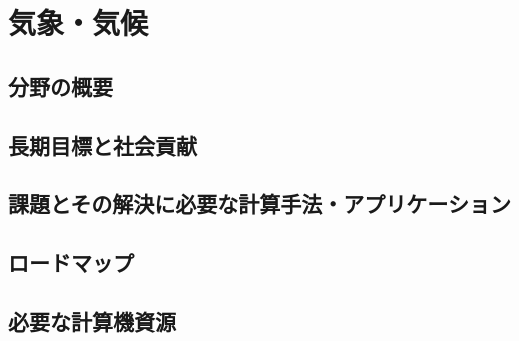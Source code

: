 \section{気象・気候}
\label{sec:気象気候}

\subsection{分野の概要}

\subsection{長期目標と社会貢献}

\subsection{課題とその解決に必要な計算手法・アプリケーション}

\subsection{ロードマップ}

\subsection{必要な計算機資源}


\nocite{*}


